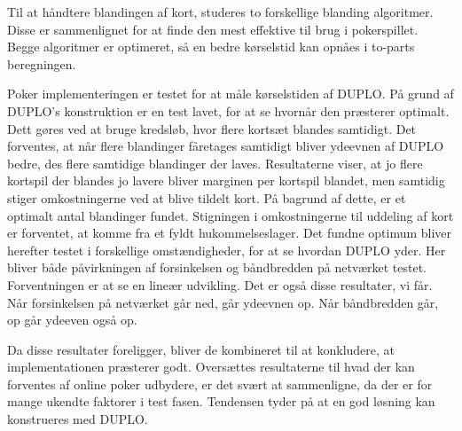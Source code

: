 \documentclass[twoside,11pt,openright]{report}
\begin{document}
Til at håndtere blandingen af kort, studeres to forskellige blanding algoritmer. Disse er sammenlignet for at finde den mest effektive til brug i pokerspillet. Begge algoritmer er optimeret, så en bedre kørselstid kan opnåes i to-parts beregningen.

Poker implementeringen er testet for at måle kørselstiden af DUPLO. På grund af DUPLO's konstruktion er en test lavet, for at se hvornår den præsterer optimalt. Dett gøres ved at bruge kredsløb, hvor flere kortsæt blandes samtidigt. Det forventes, at når flere blandinger fåretages samtidigt bliver ydeevnen af DUPLO bedre, des flere samtidige blandinger der laves. Resultaterne viser, at jo flere kortspil der blandes jo lavere bliver marginen per kortspil blandet, men samtidig stiger omkostningerne ved at blive tildelt kort. På bagrund af dette, er et optimalt antal blandinger fundet. Stigningen i omkostningerne til uddeling af kort er forventet, at komme fra et fyldt hukommelseslager. Det fundne optimum bliver herefter testet i forskellige omstændigheder, for at se hvordan DUPLO yder. Her bliver både påvirkningen af forsinkelsen og båndbredden på netværket testet. Forventningen er at se en lineær udvikling. Det er også disse resultater, vi får. Når forsinkelsen  på netværket går ned, går ydeevnen op. Når båndbredden går, op går ydeeven også op.

Da disse resultater foreligger, bliver de kombineret til at konkludere, at implementationen præsterer godt. Oversættes resultaterne til hvad der kan forventes af online poker udbydere, er det svært at sammenligne, da der er for mange ukendte faktorer i test fasen. Tendensen tyder på at en god løsning kan konstrueres med DUPLO.


\end{document}
